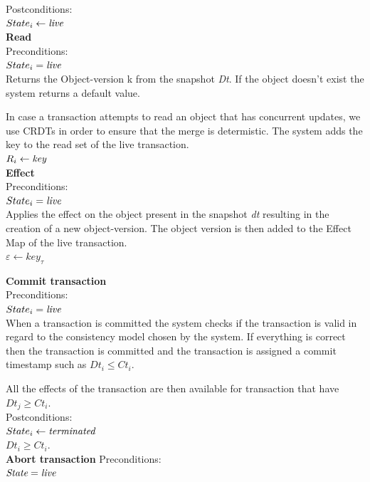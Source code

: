 \documentclass[systeme,french,english]{compas2022}
\begin{document}
Postconditions:\\
$State_i \leftarrow \emph{live}$ \\


\textbf{Read}\\
Preconditions:\\ 
$State_i = \emph{live}$ \\

Returns the Object-version k from the snapshot \emph{Dt}. 
If the object doesn't exist the system returns a default value.

In case a transaction attempts to read an object that has concurrent updates, we use CRDTs in order to ensure that the merge is determistic.
The system adds the key to the read set of the live transaction.\\
$R_i \leftarrow \emph{key}$\\

\textbf{Effect}\\
Preconditions:\\ 
$State_i = \emph{live}$ \\

Applies the effect on the object present in the snapshot \emph{dt} resulting in the creation of a new object-version.
The object version is then added to the Effect Map of the live transaction.\\
$\varepsilon \leftarrow key_{\tau}$

\textbf{Commit transaction}\\
Preconditions:\\ 
$State_i = \emph{live}$ \\

When a transaction is committed the system checks if the transaction is valid in regard to the consistency model chosen by the system.
If everything is correct then the transaction is committed and the transaction is assigned a commit timestamp such as $Dt_i \leq Ct_i$.

All the effects of the transaction are then available for transaction that have $Dt_j \geq Ct_i$.\\

Postconditions:\\
$State_i \leftarrow \emph{terminated}$ \\
$Dt_i \geq Ct_i$.\\



\textbf{Abort transaction}
Preconditions:\\ 
$\emph{State} = \emph{live}$ \\
\end{document}
